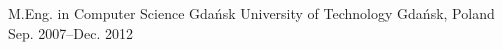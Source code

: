 
\begin{cventries}

  \cventry
    {M.Eng. in Computer Science} %
    {Gdańsk University of Technology} %
    {Gdańsk, Poland} %
    {Sep. 2007–Dec. 2012} %
    {
    }
\end{cventries}
